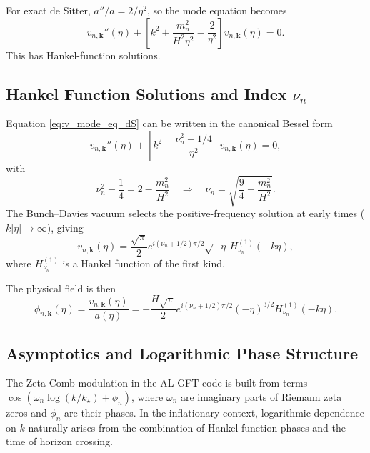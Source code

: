 \documentclass[12pt]{article}
\begin{document}
For exact de Sitter, \(a''/a = 2/\eta^2\), so the mode equation becomes
\begin{equation}
v_{n,\bm{k}}''(\eta) + \left[k^2 + \frac{m_n^2}{H^2 \eta^2} - \frac{2}{\eta^2}\right]
v_{n,\bm{k}}(\eta) = 0.
\label{eq:v_mode_eq_dS}
\end{equation}
This has Hankel-function solutions.

\subsection{Hankel Function Solutions and Index \(\nu_n\)}

Equation \eqref{eq:v_mode_eq_dS} can be written in the canonical Bessel form
\begin{equation}
v_{n,\bm{k}}''(\eta) + \left[k^2 - \frac{\nu_n^2 - 1/4}{\eta^2}\right] v_{n,\bm{k}}(\eta)
= 0,
\label{eq:v_mode_eq_Bessel}
\end{equation}
with
\begin{equation}
\nu_n^2 - \frac{1}{4} = 2 - \frac{m_n^2}{H^2}
\quad\Rightarrow\quad
\nu_n = \sqrt{\frac{9}{4} - \frac{m_n^2}{H^2}}.
\end{equation}
The Bunch–Davies vacuum selects the positive-frequency solution at early times
(\(k|\eta| \to \infty\)), giving
\begin{equation}
v_{n,\bm{k}}(\eta) = \frac{\sqrt{\pi}}{2} e^{i(\nu_n + 1/2)\pi/2}
\sqrt{-\eta}\, H^{(1)}_{\nu_n}(-k\eta),
\label{eq:v_mode_solution}
\end{equation}
where \(H^{(1)}_{\nu_n}\) is a Hankel function of the first kind.

The physical field is then
\begin{equation}
\phi_{n,\bm{k}}(\eta) = \frac{v_{n,\bm{k}}(\eta)}{a(\eta)} =
-\frac{H\sqrt{\pi}}{2} e^{i(\nu_n + 1/2)\pi/2}
(-\eta)^{3/2} H^{(1)}_{\nu_n}(-k\eta).
\label{eq:phi_mode_solution}
\end{equation}

\subsection{Asymptotics and Logarithmic Phase Structure}

The Zeta-Comb modulation in the AL-GFT code is built from terms
\(\cos(\omega_n \log(k/k_\star) + \phi_n)\), where \(\omega_n\) are imaginary
parts of Riemann zeta zeros and \(\phi_n\) are their phases. In the inflationary
context, logarithmic dependence on \(k\) naturally arises from the combination of
Hankel-function phases and the time of horizon crossing.
\end{document}
